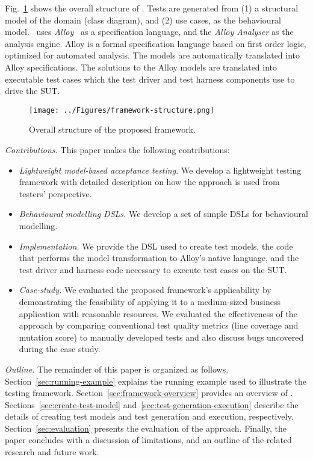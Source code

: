 Fig.~\ref{fig:framework-structure} shows the overall structure of \this. Tests are generated from (1) a structural model of the domain (class diagram), and (2) use cases, as the behavioural model. %
\this~uses \textit{Alloy}~\cite{Jackson2002} as a specification language, and the \textit{Alloy Analyser} as the analysis engine. Alloy is a formal specification language based on first order logic, optimized for automated analysis.
The models are automatically translated into Alloy specifications. The solutions to the Alloy models are translated into executable test cases which the test driver and test harness components use to drive the SUT.

\begin{figure}[!t]
\centering
\texttt{[image: ../Figures/framework-structure.png]}
\caption{Overall structure of the proposed framework.}
\label{fig:framework-structure}
\end{figure}

\textit{Contributions.} This paper makes the following
contributions:
\begin{itemize}
	\item \textit{Lightweight model-based acceptance testing.} We develop a lightweight testing framework with detailed description on how the approach is used from testers' perspective.
	
	\item \textit{Behavioural modelling DSLs.} We develop a set of simple DSLs for behavioural modelling.
	
	\item \textit{Implementation.} We provide the DSL used to create test models, the code that
	performs the model transformation to Alloy's native language, and the test driver and harness code necessary to execute test cases on the SUT.

	\item \textit{Case-study. } We evaluated the proposed framework's applicability by demonstrating the feasibility of applying it to 
a medium-sized business application with reasonable resources.
We evaluated the effectiveness of the approach by comparing conventional test quality metrics (line coverage and mutation score)
to manually developed tests and also discuss bugs uncovered during the case study.

\end{itemize}

\textit{Outline.} The remainder of this paper is organized as follows.  %
Section~\ref{sec:running-example} explains the running example used to illustrate the testing framework. Section~\ref{sec:framework-overview} provides an overview of \this. Sections~\ref{sec:create-test-model} and~\ref{sec:test-generation-execution} describe the details of creating test models and test generation and execution, respectively. Section~\ref{sec:evaluation} presents the evaluation of the approach. Finally, the paper concludes with a discussion of limitations, and an outline of the related research and future work.
